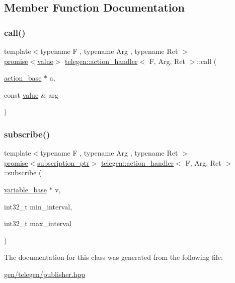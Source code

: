 \subsection{Member Function Documentation}
\mbox{\label{classtelegen_1_1action__handler_af74ede39066de588eb8f51b25d1b96a0}} 
\subsubsection{\texorpdfstring{call()}{call()}}
{\footnotesize\ttfamily template$<$typename F , typename Arg , typename Ret $>$ \\
\hyperlink{namespacetelegen_a9dd802bb5d30cf96b0c616750d43ae86}{promise}$<$\hyperlink{classtelegen_1_1value}{value}$>$ \hyperlink{classtelegen_1_1action__handler}{telegen\+::action\+\_\+handler}$<$ F, Arg, Ret $>$\+::call (\begin{DoxyParamCaption}\item[{\hyperlink{classtelegen_1_1action__base}{action\+\_\+base} $\ast$}]{a,  }\item[{const \hyperlink{classtelegen_1_1value}{value} \&}]{arg }\end{DoxyParamCaption})\hspace{0.3cm}{\ttfamily [inline]}}

\mbox{\label{classtelegen_1_1action__handler_a8a48009cf9e2893bd2801ab04465ba31}} 
\subsubsection{\texorpdfstring{subscribe()}{subscribe()}}
{\footnotesize\ttfamily template$<$typename F , typename Arg , typename Ret $>$ \\
\hyperlink{namespacetelegen_a9dd802bb5d30cf96b0c616750d43ae86}{promise}$<$\hyperlink{namespacetelegen_a27c822534a5231fe1c523c81e8768afb}{subscription\+\_\+ptr}$>$ \hyperlink{classtelegen_1_1action__handler}{telegen\+::action\+\_\+handler}$<$ F, Arg, Ret $>$\+::subscribe (\begin{DoxyParamCaption}\item[{\hyperlink{classtelegen_1_1variable__base}{variable\+\_\+base} $\ast$}]{v,  }\item[{int32\+\_\+t}]{min\+\_\+interval,  }\item[{int32\+\_\+t}]{max\+\_\+interval }\end{DoxyParamCaption})\hspace{0.3cm}{\ttfamily [inline]}}



The documentation for this class was generated from the following file\+:\begin{DoxyCompactItemize}
\item 
\hyperlink{gen_2telegen_2publisher_8hpp}{gen/telegen/publisher.\+hpp}\end{DoxyCompactItemize}

